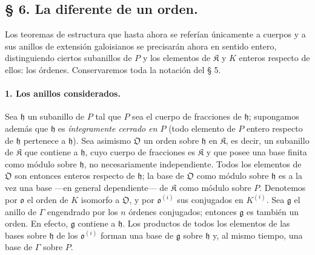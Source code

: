 \subsection*{\S{} 6. La diferente de un orden.}

Los teoremas de estructura que hasta ahora se referían únicamente a cuerpos y a sus anillos de extensión galoisianos se precisarán ahora en sentido entero, distinguiendo ciertos subanillos de $P$ y los elementos de $\mathfrak K$ y $K$ enteros respecto de ellos: los órdenes. Conservaremos toda la notación del § 5.

\paragraph{1. Los anillos considerados.}
Sea $\mathfrak h$ un subanillo de $P$ tal que $P$ sea el cuerpo de fracciones de $\mathfrak h$; supongamos además que $\mathfrak h$ es \emph{íntegramente cerrado en $P$} (todo elemento de $P$ entero respecto de $\mathfrak h$ pertenece a $\mathfrak h$). Sea asimismo $\mathfrak O$ un orden sobre $\mathfrak h$ en $\mathfrak K$, es decir, un subanillo de $\mathfrak K$ que contiene a $\mathfrak h$, cuyo cuerpo de fracciones es $\mathfrak K$ y que posee una base finita como módulo sobre $\mathfrak h$, no necesariamente independiente. Todos los elementos de $\mathfrak O$ son entonces enteros respecto de $\mathfrak h$; la base de $\mathfrak O$ como módulo sobre $\mathfrak h$ es a la vez una base ---en general dependiente--- de $\mathfrak K$ como módulo sobre $P$. Denotemos por $\mathfrak o$ el orden de $K$ isomorfo a $\mathfrak O$, y por $\mathfrak o^{(i)}$ sus conjugados en $K^{(i)}$. Sea $\mathfrak g$ el anillo de $\Gamma$ engendrado por los $n$ órdenes conjugados; entonces $\mathfrak g$ es también un orden. En efecto, $\mathfrak g$ contiene a $\mathfrak h$. Los productos de todos los elementos de las bases sobre $\mathfrak h$ de los $\mathfrak o^{(i)}$ forman una base de $\mathfrak g$ sobre $\mathfrak h$ y, al mismo tiempo, una base de $\Gamma$ sobre $P$.

